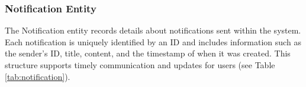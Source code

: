 	
%	
%		
%		
%		
%		
%
%	
	
	
	\subsubsection{Notification Entity}
	The Notification entity records details about notifications sent within the system. Each notification is uniquely identified by an ID and includes information such as the sender's ID, title, content, and the timestamp of when it was created. This structure supports timely communication and updates for users (see Table \ref{tab:notification}).
	
